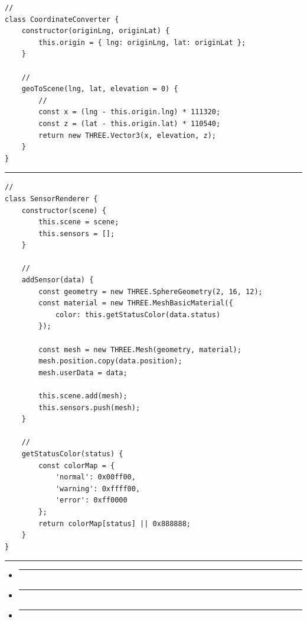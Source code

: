 \begin{verbatim}
// 
class CoordinateConverter {
    constructor(originLng, originLat) {
        this.origin = { lng: originLng, lat: originLat };
    }
    
    // 
    geoToScene(lng, lat, elevation = 0) {
        // 
        const x = (lng - this.origin.lng) * 111320;
        const z = (lat - this.origin.lat) * 110540;
        return new THREE.Vector3(x, elevation, z);
    }
}
\end{verbatim}

\begin{center}\rule{0.5\linewidth}{0.5pt}\end{center}

\begin{verbatim}
// 
class SensorRenderer {
    constructor(scene) {
        this.scene = scene;
        this.sensors = [];
    }
    
    // 
    addSensor(data) {
        const geometry = new THREE.SphereGeometry(2, 16, 12);
        const material = new THREE.MeshBasicMaterial({
            color: this.getStatusColor(data.status)
        });
        
        const mesh = new THREE.Mesh(geometry, material);
        mesh.position.copy(data.position);
        mesh.userData = data;
        
        this.scene.add(mesh);
        this.sensors.push(mesh);
    }
    
    // 
    getStatusColor(status) {
        const colorMap = {
            'normal': 0x00ff00,
            'warning': 0xffff00, 
            'error': 0xff0000
        };
        return colorMap[status] || 0x888888;
    }
}
\end{verbatim}

\begin{center}\rule{0.5\linewidth}{0.5pt}\end{center}

\begin{itemize}
\item
  \begin{center}\rule{0.5\linewidth}{0.5pt}\end{center}
\item
  \begin{center}\rule{0.5\linewidth}{0.5pt}\end{center}
\item
  \begin{center}\rule{0.5\linewidth}{0.5pt}\end{center}
\end{itemize}


